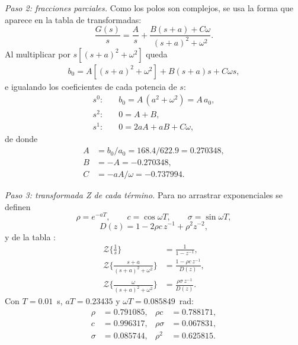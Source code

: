 \documentclass[conference]{IEEEtran}
\begin{document}
\textit{Paso 2: fracciones parciales.} Como los polos son complejos, se usa la
forma que aparece en la tabla de transformadas:
\begin{equation}
  \frac{G(s)}{s} = \frac{A}{s} + \frac{B(s+a) + C\omega}{(s+a)^2+\omega^2}.
  \label{eq:fp}
\end{equation}
Al multiplicar por $s[(s+a)^2+\omega^2]$ queda
\begin{align*}
  b_0 = A\left[(s+a)^2+\omega^2\right] + B(s+a)s + C\omega s,
\end{align*}
e igualando los coeficientes de cada potencia de $s$:
\begin{align*}
  s^0:&\quad b_0 = A\,(a^2+\omega^2) = A\,a_0,\\
  s^2:&\quad 0 = A + B,\\
  s^1:&\quad 0 = 2aA + aB + C\omega,
\end{align*}
de donde
\begin{align*}
  A &= b_0/a_0 = 168.4/622.9 = 0.270348,\\
  B &= -A = -0.270348,\\
  C &= -aA/\omega = -0.737994.
\end{align*}

\textit{Paso 3: transformada Z de cada término.} Para no arrastrar
exponenciales se definen
\begin{equation}
  \rho = e^{-aT},\qquad c = \cos\omega T,\qquad \sigma = \sin\omega T,
  \label{eq:sym}
\end{equation}
\begin{equation}
  D(z) = 1 - 2\rho c\,z^{-1} + \rho^2 z^{-2},
  \label{eq:Dz}
\end{equation}
y de la tabla \cite{ogata1995}:
\begin{align*}
  \mathcal{Z}\Big\{\frac{1}{s}\Big\} &= \frac{1}{1-z^{-1}},\\
  \mathcal{Z}\Big\{\frac{s+a}{(s+a)^2+\omega^2}\Big\} &= \frac{1-\rho c\,z^{-1}}{D(z)},\\
  \mathcal{Z}\Big\{\frac{\omega}{(s+a)^2+\omega^2}\Big\} &= \frac{\rho\sigma\,z^{-1}}{D(z)}.
\end{align*}
Con $T = 0.01$~s, $aT = 0.23435$ y $\omega T = 0.085849$~rad:
\begin{align*}
  \rho &= 0.791085, & \rho c &= 0.788171,\\
  c &= 0.996317, & \rho\sigma &= 0.067831,\\
  \sigma &= 0.085744, & \rho^2 &= 0.625815.
\end{align*}
\end{document}
